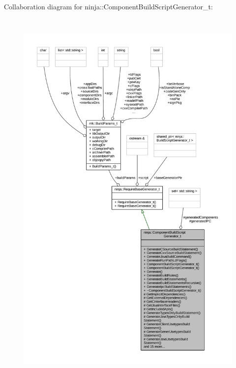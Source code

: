 Collaboration diagram for ninja\+:\+:Component\+Build\+Script\+Generator\+\_\+t\+:
\nopagebreak
\begin{figure}[H]
\begin{center}
\leavevmode
\includegraphics[height=550pt]{classninja_1_1_component_build_script_generator__t__coll__graph}
\end{center}
\end{figure}
